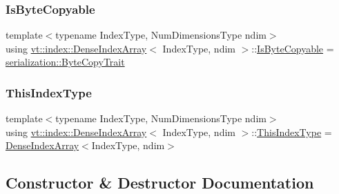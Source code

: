 \mbox{\label{structvt_1_1index_1_1_dense_index_array_a0d13f3168c5d8b4b3abc6cb083d34bc3}} 
\subsubsection{\texorpdfstring{Is\+Byte\+Copyable}{IsByteCopyable}}
{\footnotesize\ttfamily template$<$typename Index\+Type, Num\+Dimensions\+Type ndim$>$ \\
using \hyperlink{structvt_1_1index_1_1_dense_index_array}{vt\+::index\+::\+Dense\+Index\+Array}$<$ Index\+Type, ndim $>$\+::\hyperlink{structvt_1_1index_1_1_dense_index_array_a0d13f3168c5d8b4b3abc6cb083d34bc3}{Is\+Byte\+Copyable} =  \hyperlink{structvt_1_1serialization_1_1_byte_copy_trait}{serialization\+::\+Byte\+Copy\+Trait}}

\mbox{\label{structvt_1_1index_1_1_dense_index_array_a6915511f6a82dff2522d6e8c2be20f2a}} 
\subsubsection{\texorpdfstring{This\+Index\+Type}{ThisIndexType}}
{\footnotesize\ttfamily template$<$typename Index\+Type, Num\+Dimensions\+Type ndim$>$ \\
using \hyperlink{structvt_1_1index_1_1_dense_index_array}{vt\+::index\+::\+Dense\+Index\+Array}$<$ Index\+Type, ndim $>$\+::\hyperlink{structvt_1_1index_1_1_dense_index_array_a6915511f6a82dff2522d6e8c2be20f2a}{This\+Index\+Type} =  \hyperlink{structvt_1_1index_1_1_dense_index_array}{Dense\+Index\+Array}$<$Index\+Type, ndim$>$}



\subsection{Constructor \& Destructor Documentation}
\mbox{\label{structvt_1_1index_1_1_dense_index_array_afcd3d27f0c86b6c37540ae78f9afc2d1}} 
